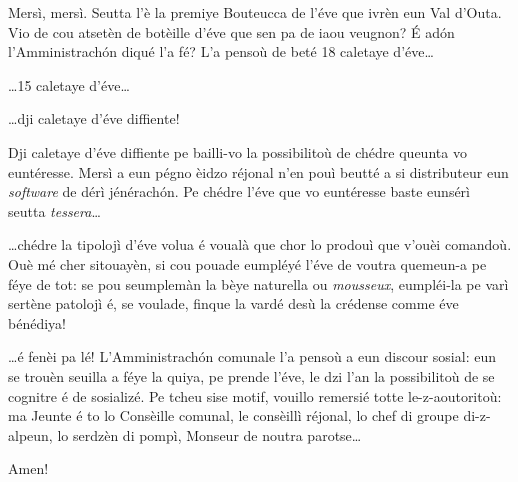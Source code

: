 \begin{drama}

\Seunteuccospeaks Mersì, mersì. Seutta l'è la premiye Bouteucca de l'é\-ve que ivrèn eun Val d'Outa. Vio de cou atsetèn de botèille d'éve que sen pa de iaou veugnon? \'E ad\'on l’Amministrach\'on diqué l’a fé? L'a pensoù de beté 18 caletaye d’éve\ldots


\Seunteuccospeaks \ldots 15 caletaye d’éve\ldots


\Seunteuccospeaks \ldots dji caletaye d’éve
 diffiente!
 
 
\Seunteuccospeaks  Dji caletaye d’éve
 diffiente pe bailli-vo la possibilitoù de chédre queunta vo euntéresse. Mersì a eun pégno èidzo réjonal n'en pouì beutté a si distributeur eun \textit{software} de dérì jénérach\'on. Pe chédre l'éve que vo euntéresse baste eunsérì  seutta \textit{tessera}\ldots
 
 
\Seunteuccospeaks \ldots  chédre la tipolojì d’éve volua é voualà que chor lo prodouì que v'ouèi comandoù. Ouè mé cher sitouayèn, si cou pouade eumpléyé l'éve de voutra quemeun-a pe féye de tot: se pou seumplemàn la bèye naturella ou \textit{mousseux}, eumpléi-la pe varì sertène patolojì é, se voulade, finque la vardé desù la crédense comme éve bénédiya!


\Seunteuccospeaks \ldots é fenèi pa lé! L’Amministrach\'on comunale l’a pensoù a eun discour sosial: eun se trouèn seuilla a féye la quiya, pe prende l’éve, le dzi l’an la possibilitoù de se cognitre é de sosializé. Pe tcheu sise motif, vouillo remersié totte le-z-aouto\-ri\-toù: ma Jeunte é to lo Consèille comunal, le consèillì réjonal, lo chef di groupe di-z-alpeun, lo serdzèn di pompì, Monseur de noutra parotse\ldots

\Donspeaks {} Amen! \stufo



\end{drama}

